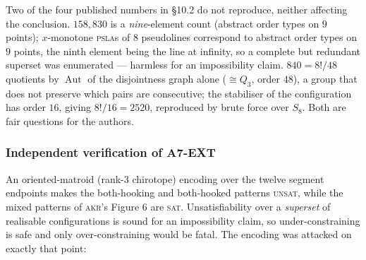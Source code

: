 \documentclass[11pt,a4paper]{article}
\theoremstyle{plain}
\theoremstyle{definition}
\theoremstyle{remark}
\begin{document}
\begin{enumerate}[leftmargin=*]
    Two of the four published numbers in \S10.2 do not reproduce, neither
    affecting the conclusion. $158{,}830$ is a \emph{nine}-element count
    (abstract order types on $9$ points); $x$-monotone \textsc{psla}s of $8$
    pseudolines correspond to abstract order types on $9$ points, the ninth
    element being the line at infinity, so a complete but redundant superset was
    enumerated --- harmless for an impossibility claim. $840=8!/48$ quotients by
    $\operatorname{Aut}$ of the disjointness graph alone ($\cong Q_3$, order
    $48$), a group that does not preserve which pairs are consecutive; the
    stabiliser of the configuration has order $16$, giving $8!/16=2520$,
    reproduced by brute force over $S_8$. Both are fair questions for the
    authors.
\end{enumerate}

\subsubsection*{Independent verification of \textsf{A7-EXT}}

An oriented-matroid (rank-3 chirotope) encoding over the twelve segment
endpoints makes the both-hooking and both-hooked patterns \textsc{unsat}, while
the mixed patterns of \textsc{akr}'s Figure 6 are \textsc{sat}. Unsatisfiability
over a \emph{superset} of realisable configurations is sound for an
impossibility claim, so under-constraining is safe and only over-constraining
would be fatal. The encoding was attacked on exactly that point:
\end{document}
